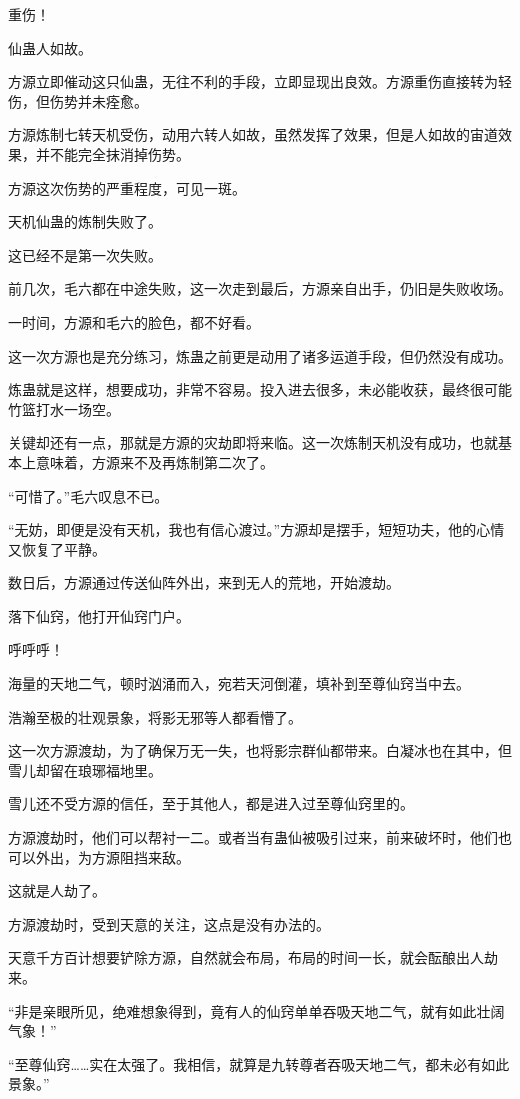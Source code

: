 \begin{this_body}
重伤！

仙蛊人如故。

方源立即催动这只仙蛊，无往不利的手段，立即显现出良效。方源重伤直接转为轻伤，但伤势并未痊愈。

方源炼制七转天机受伤，动用六转人如故，虽然发挥了效果，但是人如故的宙道效果，并不能完全抹消掉伤势。

方源这次伤势的严重程度，可见一斑。

天机仙蛊的炼制失败了。

这已经不是第一次失败。

前几次，毛六都在中途失败，这一次走到最后，方源亲自出手，仍旧是失败收场。

一时间，方源和毛六的脸色，都不好看。

这一次方源也是充分练习，炼蛊之前更是动用了诸多运道手段，但仍然没有成功。

炼蛊就是这样，想要成功，非常不容易。投入进去很多，未必能收获，最终很可能竹篮打水一场空。

关键却还有一点，那就是方源的灾劫即将来临。这一次炼制天机没有成功，也就基本上意味着，方源来不及再炼制第二次了。

“可惜了。”毛六叹息不已。

“无妨，即便是没有天机，我也有信心渡过。”方源却是摆手，短短功夫，他的心情又恢复了平静。

数日后，方源通过传送仙阵外出，来到无人的荒地，开始渡劫。

落下仙窍，他打开仙窍门户。

呼呼呼！

海量的天地二气，顿时汹涌而入，宛若天河倒灌，填补到至尊仙窍当中去。

浩瀚至极的壮观景象，将影无邪等人都看懵了。

这一次方源渡劫，为了确保万无一失，也将影宗群仙都带来。白凝冰也在其中，但雪儿却留在琅琊福地里。

雪儿还不受方源的信任，至于其他人，都是进入过至尊仙窍里的。

方源渡劫时，他们可以帮衬一二。或者当有蛊仙被吸引过来，前来破坏时，他们也可以外出，为方源阻挡来敌。

这就是人劫了。

方源渡劫时，受到天意的关注，这点是没有办法的。

天意千方百计想要铲除方源，自然就会布局，布局的时间一长，就会酝酿出人劫来。

“非是亲眼所见，绝难想象得到，竟有人的仙窍单单吞吸天地二气，就有如此壮阔气象！”

“至尊仙窍……实在太强了。我相信，就算是九转尊者吞吸天地二气，都未必有如此景象。”


\end{this_body}
